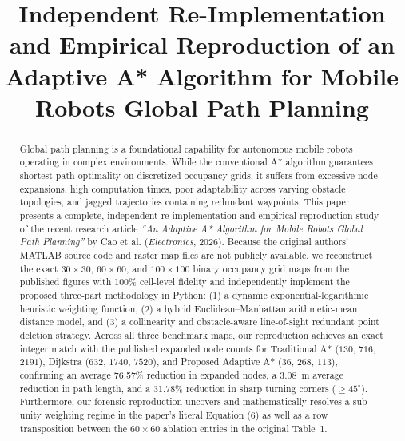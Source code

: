 \documentclass[conference]{IEEEtran}
\begin{document}
\title{Independent Re-Implementation and Empirical Reproduction of an Adaptive A* Algorithm for Mobile Robots Global Path Planning}

\author{
}

\maketitle

\begin{abstract}
Global path planning is a foundational capability for autonomous mobile robots operating in complex environments. While the conventional A* algorithm guarantees shortest-path optimality on discretized occupancy grids, it suffers from excessive node expansions, high computation times, poor adaptability across varying obstacle topologies, and jagged trajectories containing redundant waypoints. This paper presents a complete, independent re-implementation and empirical reproduction study of the recent research article \textit{``An Adaptive A* Algorithm for Mobile Robots Global Path Planning''} by Cao et al. (\textit{Electronics}, 2026). Because the original authors' MATLAB source code and raster map files are not publicly available, we reconstruct the exact $30 \times 30$, $60 \times 60$, and $100 \times 100$ binary occupancy grid maps from the published figures with 100\% cell-level fidelity and independently implement the proposed three-part methodology in Python: (1) a dynamic exponential-logarithmic heuristic weighting function, (2) a hybrid Euclidean--Manhattan arithmetic-mean distance model, and (3) a collinearity and obstacle-aware line-of-sight redundant point deletion strategy. Across all three benchmark maps, our reproduction achieves an exact integer match with the published expanded node counts for Traditional A* ($130$, $716$, $2191$), Dijkstra ($632$, $1740$, $7520$), and Proposed Adaptive A* ($36$, $268$, $113$), confirming an average 76.57\% reduction in expanded nodes, a 3.08~m average reduction in path length, and a 31.78\% reduction in sharp turning corners ($\ge 45^\circ$). Furthermore, our forensic reproduction uncovers and mathematically resolves a sub-unity weighting regime in the paper's literal Equation (6) as well as a row transposition between the $60 \times 60$ ablation entries in the original Table~1.
\end{abstract}
\end{document}
